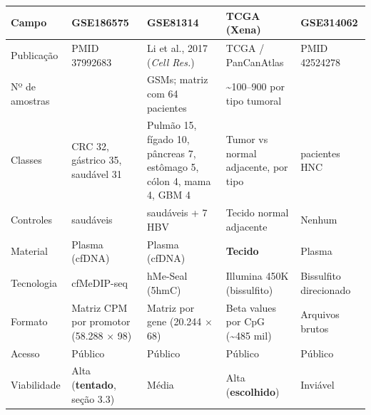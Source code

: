 \documentclass[11pt,a4paper]{article}
\begin{document}
{\def\LTcaptype{none} %
\begin{longtable}[]{@{}
  >{\raggedright\arraybackslash}p{}
  >{\raggedright\arraybackslash}p{}
  >{\raggedright\arraybackslash}p{}
  >{\raggedright\arraybackslash}p{}
  >{\raggedright\arraybackslash}p{}@{}}
\toprule\noalign{}
\begin{minipage}[b]{\linewidth}\raggedright
Campo
\end{minipage} & \begin{minipage}[b]{\linewidth}\raggedright
GSE186575
\end{minipage} & \begin{minipage}[b]{\linewidth}\raggedright
GSE81314
\end{minipage} & \begin{minipage}[b]{\linewidth}\raggedright
TCGA (Xena)
\end{minipage} & \begin{minipage}[b]{\linewidth}\raggedright
GSE314062
\end{minipage} \\
\midrule\noalign{}
\endhead
\bottomrule\noalign{}
\endlastfoot
Publicação & PMID 37992683 & Li et al., 2017 (\emph{Cell Res.}) & TCGA /
PanCanAtlas & PMID 42524278 \\
Nº de amostras & 98 & 126 GSMs; matriz com 64 pacientes &
\textasciitilde100--900 por tipo tumoral & 5 \\
Classes & CRC 32, gástrico 35, saudável 31 & Pulmão 15, fígado 10, pâncreas 7,
estômago 5, cólon 4, mama 4, GBM 4 & Tumor vs normal adjacente, por tipo & 3
pacientes HNC \\
Controles & 31 saudáveis & 8 saudáveis + 7 HBV & Tecido normal adjacente &
Nenhum \\
Material & Plasma (cfDNA) & Plasma (cfDNA) & \textbf{Tecido} & Plasma \\
Tecnologia & cfMeDIP-seq & hMe-Seal (5hmC) & Illumina 450K (bissulfito) &
Bissulfito direcionado \\
Formato & Matriz CPM por promotor (58.288 $\times$ 98) & Matriz por gene (20.244 $\times$ 68)
& Beta values por CpG (\textasciitilde485 mil) & Arquivos brutos \\
Acesso & Público & Público & Público & Público \\
Viabilidade & Alta (\textbf{tentado}, seção 3.3) & Média & Alta
(\textbf{escolhido}) & Inviável \\
\end{longtable}
}
\end{document}
